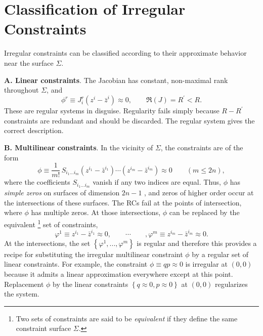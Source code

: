 \documentclass[a4paper,thmsa,11pt]{article}
\begin{document}

\section{Classification of Irregular Constraints}

Irregular constraints can be classified according to their approximate
behavior near the surface $\Sigma $.

\textbf{A. Linear constraints}. The Jacobian has constant, non-maximal rank
throughout $\Sigma $, and
\begin{equation}
\phi ^{r}\equiv J_{i}^{r}\left( z^{i}-\bar{z}^{i}\right) \approx 0,\qquad
\Re (J)=R^{\prime }<R.
\end{equation}
These are regular systems in disguise. Regularity fails simply because $%
R-R^{\prime }$ constraints are redundant and should be discarded. The
regular system gives the correct description.

\textbf{B. Multilinear constraints}. In the vicinity of $\Sigma $, the
constraints are of the form
\begin{equation}
\phi \equiv \frac{1}{m!}\,S_{i_{1}\ldots i_{m}}\left( z^{i_{1}}-\bar{z}%
^{i_{1}}\right) \cdots \left( z^{i_{m}}-\bar{z}^{i_{m}}\right) \approx
0\qquad \left( m\leq 2n\right) ,
\end{equation}
where the coefficients $S_{i_{1}\ldots i_{m}}$ vanish if any two indices are
equal. Thus, $\phi $ has \emph{simple zeros} on surfaces of dimension $2n-1$%
, and zeros of higher order occur at the intersections of these surfaces.
The RCs fail at the points of intersection, where $\phi $ has multiple
zeros. At those intersections, $\phi $ can be replaced by the equivalent%
\footnote{%
Two sets of constraints are said to be \emph{equivalent} if they define the
same constraint surface $\Sigma $.} set of constraints,
\begin{equation}
\varphi ^{1}\equiv z^{i_{1}}-\bar{z}^{i_{1}}\approx 0,\qquad \cdots \qquad ,%
\varphi ^{m}\equiv z^{i_{m}}-\bar{z}^{i_{m}}\approx 0.
\end{equation}
At the intersections, the set $\left\{ \varphi ^{1},...,\varphi ^{m}\right\}
$ is regular and therefore this provides a recipe for substituting the
irregular multilinear constraint $\phi $ by a regular set of linear
constraints. For example, the constraint $\phi \equiv qp\approx 0$ is
irregular at $(0,0)$ because it admits a linear approximation everywhere
except at this point. Replacement $\phi $ by the linear constraints $\left\{
q\approx 0,p\approx 0\right\} $ at $(0,0)$ regularizes the system.
\end{document}
